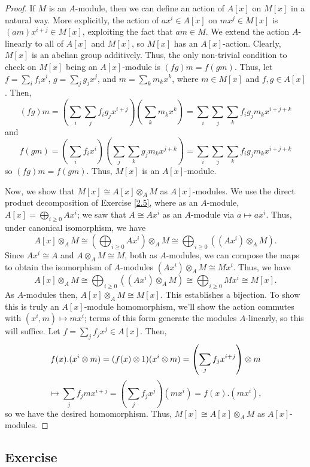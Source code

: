 \begin{proof}
If $M$ is an $A$-module, then we can define an action of $A[x]$ on $M[x]$ in a natural way. More explicitly, the action of $ax^i \in A[x]$ on $mx^j \in M[x]$ is
$(am)x^{i+j} \in M[x]$, exploiting the fact that $am \in M$. We extend the action $A$-linearly to all of $A[x]$ and $M[x]$, so $M[x]$ has an $A[x]$-action. Clearly, $M[x]$ is an 
abelian group additively. 
Thus, the only non-trivial condition to check on $M[x]$ being an $A[x]$-module is $(fg)m = f(gm)$. Thus, let $f = \sum_i f_i x^i$, $g = \sum_j g_j x^j$, and $m = \sum_k m_k x^k$, 
where $m \in M[x]$ and $f,g \in A[x]$. Then,
$$(fg)m = \left(\sum_i\sum_j f_ig_j x^{i+j}\right)\left(\sum_k m_k x^k\right) = \sum_i\sum_j\sum_k  f_ig_jm_k x^{i+j+k}$$
and
$$f(gm) = \left(\sum_i f_ix^i\right)\left(\sum_j\sum_k g_jm_k x^{j+k}\right) = \sum_i\sum_j\sum_k  f_ig_jm_k x^{i+j+k}$$
so $(fg)m = f(gm)$. Thus, $M[x]$ is an $A[x]$-module.

Now, we show that $M[x] \cong A[x] \otimes_A M$ as $A[x]$-modules. We use the direct product decomposition of Exercise \ref{2.5}, where as an $A$-module, $A[x] = \bigoplus_{i\ge 0}A x^i$; we saw that
$A \cong Ax^i$ as an $A$-module via $a \mapsto ax^i$. Thus, under canonical isomorphism, we have
$$A[x] \otimes_A M \cong \left(\bigoplus_{i\ge 0}A x^i\right)\otimes_A M \cong \bigoplus_{i\ge 0}\left((A x^i)\otimes_A M\right).$$
Since $Ax^i \cong A$ and $A \otimes_A M \cong M$, both as $A$-modules, we can compose the maps to obtain the isomorphism of $A$-modules $(Ax^i)\otimes_A M \cong Mx^i$. Thus, we have
$$A[x] \otimes_A M \cong \bigoplus_{i\ge 0}\left((A x^i)\otimes_A M\right) \cong \bigoplus_{i\ge 0} Mx^i \cong M[x].$$
As $A$-modules then, $A[x]\otimes_A M\cong M[x]$. This establishes a bijection. To show this is truly an $A[x]$-module homomorphism, we'll show the action commutes with $(x^i,m) \mapsto mx^i$; terms
of this form generate the modules $A$-linearly, so this will suffice. Let $f = \sum_j f_j x^j \in A[x]$. Then,
$$f(x).(x^i\otimes m) = (f(x)\otimes 1)(x^i\otimes m) = \left(\sum_j f_j x^{i+j}\right)\otimes m \\$$
$$\mapsto \sum_j f_jm x^{i+j} = \left(\sum_j f_j x^j\right)(mx^i) = f(x).(mx^i),$$
so we have the desired homomorphism. Thus, $M[x] \cong A[x] \otimes_A M$ as $A[x]$-modules.
\end{proof}

\subsection{Exercise}\label{2.7} %

